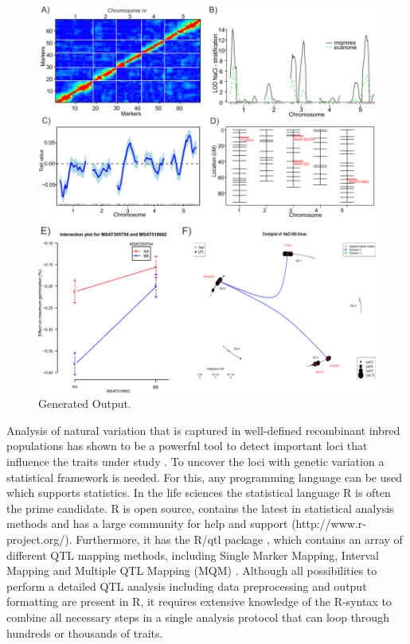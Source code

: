 \begin{figure}[h!]
  \centering
  \includegraphics[keepaspectratio,scale=0.30]{eps/image_3_1_2.eps}
  \caption[Generated Output.]
    {Generated Output.}
\end{figure}

Analysis of natural variation that is captured in well-defined recombinant inbred populations has 
shown to be a powerful tool to detect important loci that influence the traits under study 
\cite{Alonso-Blanco:2009}. To uncover the loci with genetic variation a statistical framework is 
needed. For this, any programming language can be used which supports statistics. In the life sciences 
the statistical language R is often the prime candidate. R is open source, contains the latest in 
statistical analysis methods and has a large community for help and support (http://www.r-project.org/). 
Furthermore, it has the R/qtl package \cite{Broman:2003}, which contains an array of different 
QTL mapping methods, including Single Marker Mapping, Interval Mapping and Multiple QTL Mapping (MQM) 
\cite{Arends:2010}. Although all possibilities to perform a detailed QTL analysis including data 
preprocessing and output formatting are present in R, it requires extensive knowledge of the R-syntax 
to combine all necessary steps in a single analysis protocol that can loop through hundreds or 
thousands of traits. 

